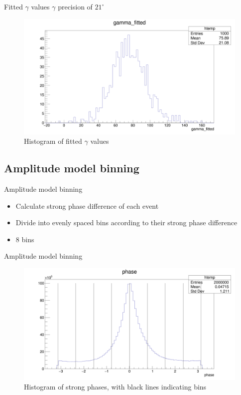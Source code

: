 \documentclass{beamer}
\begin{document}
\begin{frame}{Fitted $\gamma$ values}
  $\gamma$ precision of $21^\circ$
  \begin{figure}
    \centering
    \includegraphics[width = 1.0\textwidth]{SophisticatedPulls/gammafitted1K1K.png}
    \caption{Histogram of fitted $\gamma$ values}
  \end{figure}
\end{frame}

\subsection{Amplitude model binning}
\begin{frame}{Amplitude model binning}
  \begin{itemize}
    \item{Calculate strong phase difference of each event}
    \item{Divide into evenly spaced bins according to their strong phase difference}
    \item{$8$ bins}
  \end{itemize}
\end{frame}

\begin{frame}{Amplitude model binning}
  \begin{figure}
    \centering
    \includegraphics[width = 1.0\textwidth]{EvenStrongPhaseBins.png}
    \caption{Histogram of strong phases, with black lines indicating bins}
  \end{figure}
\end{frame}
\end{document}
